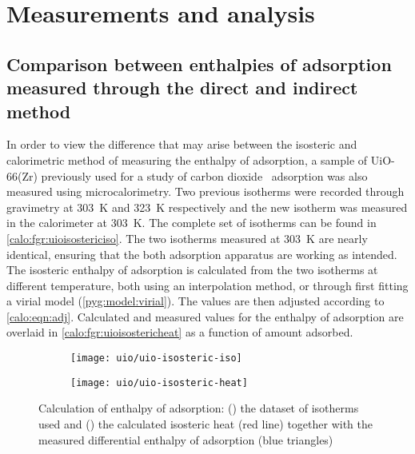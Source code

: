
\section{Measurements and analysis}

\subsection{Comparison between enthalpies of adsorption measured
	through the direct and indirect method}

In order to view the difference that may arise between the isosteric 
and calorimetric method of measuring the enthalpy of adsorption, 
a sample of UiO-66(Zr) previously used for a study of 
carbon dioxide~\cite{wiersumEvaluationUiO66GasBased2011} adsorption
was also measured using microcalorimetry.
Two previous isotherms were recorded through gravimetry at \SI{303}{\kelvin} and
\SI{323}{\kelvin} respectively and the new isotherm was measured in the 
calorimeter at \SI{303}{\kelvin}. The complete set of isotherms can
be found in \autoref{calo:fgr:uioisostericiso}.
The two isotherms measured at \SI{303}{\kelvin} are nearly identical, 
ensuring that the both adsorption apparatus are working as intended.
The isosteric enthalpy of adsorption is calculated from the two isotherms
at different temperature, both using an interpolation method, or through
first fitting a virial model (\autoref{pyg:model:virial}).
The values are then adjusted according to \autoref{calo:eqn:adj}.
Calculated and measured values for the enthalpy of adsorption are overlaid
in \autoref{calo:fgr:uioisostericheat} as a function of amount adsorbed.

\begin{figure}[htb]
	\centering

	\begin{subfigure}[b]{.5\textwidth}
		\centering
		\texttt{[image: uio/uio-isosteric-iso]}
		\caption{}%
		\label{calo:fgr:uioisostericiso}
	\end{subfigure}%
	\begin{subfigure}[b]{.5\textwidth}
		\centering
		\texttt{[image: uio/uio-isosteric-heat]}
		\caption{}%
		\label{calo:fgr:uioisostericheat}
	\end{subfigure}
	\caption{Calculation of enthalpy of adsorption:
		(\protect{})
		the dataset of isotherms used and
		(\protect{}) the calculated
		isosteric heat (red line) together with the measured
		differential enthalpy of adsorption (blue triangles)}%
	\label{calo:fgr:uioisosteric}

\end{figure}

